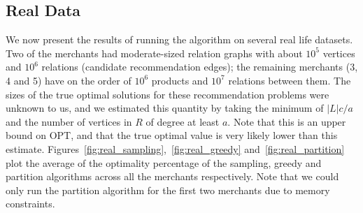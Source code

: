 \subsection{Real Data}
We now present the results of running the algorithm on several real life datasets. Two of the merchants had moderate-sized relation graphs with about $10^5$ vertices and $10^6$ relations (candidate recommendation edges);  the remaining merchants (3, 4 and 5) have on the order of $10^6$ products and $10^7$ relations between them. The sizes of the true optimal solutions for these recommendation problems were unknown to us, and we estimated this quantity by taking the minimum of $|L|c/a$ and the number of vertices in $R$ of degree at least $a$. Note that this is an upper bound on OPT, and that the true optimal value is very likely lower than this estimate. Figures~\ref{fig:real_sampling},~\ref{fig:real_greedy} and~\ref{fig:real_partition} plot the average of the optimality percentage of the sampling, greedy and partition algorithms across all the merchants respectively. Note that we could only run the partition algorithm for the first two merchants due to memory constraints. \vs

